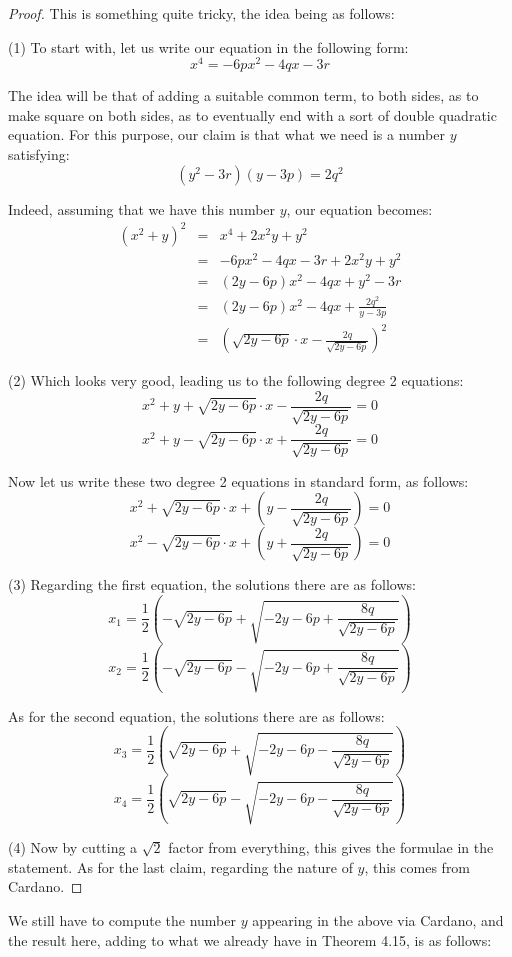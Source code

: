 \documentclass[12pt]{amsbook}
\begin{document}
\begin{proof}
This is something quite tricky, the idea being as follows:

\medskip

(1) To start with, let us write our equation in the following form:
$$x^4=-6px^2-4qx-3r$$

The idea will be that of adding a suitable common term, to both sides, as to make square on both sides, as to eventually end with a sort of double quadratic equation. For this purpose, our claim is that what we need is a number $y$ satisfying:
$$(y^2-3r)(y-3p)=2q^2$$

Indeed, assuming that we have this number $y$, our equation becomes:
\begin{eqnarray*}
(x^2+y)^2
&=&x^4+2x^2y+y^2\\
&=&-6px^2-4qx-3r+2x^2y+y^2\\
&=&(2y-6p)x^2-4qx+y^2-3r\\
&=&(2y-6p)x^2-4qx+\frac{2q^2}{y-3p}\\
&=&\left(\sqrt{2y-6p}\cdot x-\frac{2q}{\sqrt{2y-6p}}\right)^2
\end{eqnarray*}

(2) Which looks very good, leading us to the following degree 2 equations:
$$x^2+y+\sqrt{2y-6p}\cdot x-\frac{2q}{\sqrt{2y-6p}}=0$$
$$x^2+y-\sqrt{2y-6p}\cdot x+\frac{2q}{\sqrt{2y-6p}}=0$$

Now let us write these two degree 2 equations in standard form, as follows:
$$x^2+\sqrt{2y-6p}\cdot x+\left(y-\frac{2q}{\sqrt{2y-6p}}\right)=0$$
$$x^2-\sqrt{2y-6p}\cdot x+\left(y+\frac{2q}{\sqrt{2y-6p}}\right)=0$$

(3) Regarding the first equation, the solutions there are as follows:
$$x_1=\frac{1}{2}\left(-\sqrt{2y-6p}+\sqrt{-2y-6p+\frac{8q}{\sqrt{2y-6p}}}\right)$$
$$x_2=\frac{1}{2}\left(-\sqrt{2y-6p}-\sqrt{-2y-6p+\frac{8q}{\sqrt{2y-6p}}}\right)$$

As for the second equation, the solutions there are as follows:
$$x_3=\frac{1}{2}\left(\sqrt{2y-6p}+\sqrt{-2y-6p-\frac{8q}{\sqrt{2y-6p}}}\right)$$
$$x_4=\frac{1}{2}\left(\sqrt{2y-6p}-\sqrt{-2y-6p-\frac{8q}{\sqrt{2y-6p}}}\right)$$

(4) Now by cutting a $\sqrt{2}$ factor from everything, this gives the formulae in the statement. As for the last claim, regarding the nature of $y$, this comes from Cardano.
\end{proof}

We still have to compute the number $y$ appearing in the above via Cardano, and the result here, adding to what we already have in Theorem 4.15, is as follows:
\end{document}
